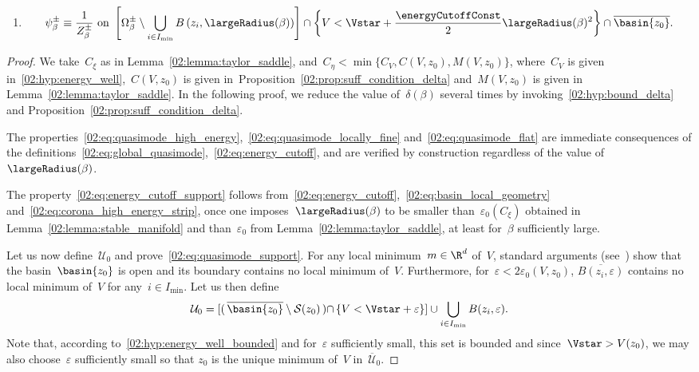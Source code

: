 \begin{proposition}
\begin{enumerate}[]
                    \item{\begin{equation}\label{02:eq:quasimode_flat}
                        \psi_\beta^\pm \equiv \frac1{Z_\beta^\pm}\text{ on }\left[\Omega_\beta^\pm \setminus \bigcup_{i\in I_{\min}} B\left(z_i,\largeRadius(\beta)\right)\right] \cap \left\{V < \Vstar + \frac{\energyCutoffConst}2\largeRadius(\beta)^2\right\} \cap \overline{\basin{z_0}}.
                    \end{equation}}
                \end{enumerate}
            \end{proposition}
            \begin{proof}

                We take~$C_\xi$ as in Lemma~\ref{02:lemma:taylor_saddle}, and~$C_\eta < \min\{C_V,C(V,z_0),M(V,z_0)\}$, where~$C_V$ is given in~\eqref{02:hyp:energy_well},~$C(V,z_0)$ is given in~Proposition~\ref{02:prop:suff_condition_delta} and~$M(V,z_0)$ is given in Lemma~\ref{02:lemma:taylor_saddle}.
                In the following proof, we reduce the value of~$\delta(\beta)$ several times by invoking~\eqref{02:hyp:bound_delta} and Proposition~\ref{02:prop:suff_condition_delta}.

                The properties~\eqref{02:eq:quasimode_high_energy},~\eqref{02:eq:quasimode_locally_fine} and~\eqref{02:eq:quasimode_flat} are immediate consequences of the definitions~\eqref{02:eq:global_quasimode},~\eqref{02:eq:energy_cutoff}, and are verified by construction regardless of the value of~$\largeRadius(\beta)$.
                
                The property~\eqref{02:eq:energy_cutoff_support} follows from~\eqref{02:eq:energy_cutoff},~\eqref{02:eq:basin_local_geometry} and~\eqref{02:eq:corona_high_energy_strip}, once one imposes~$\largeRadius(\beta)$ to be smaller than~$\varepsilon_0(C_\xi)$ obtained in Lemma~\ref{02:lemma:stable_manifold} and than~$\varepsilon_0$ from Lemma~\ref{02:lemma:taylor_saddle}, at least for~$\beta$ sufficiently large.

                Let us now define~$\mathcal U_0$ and prove~\eqref{02:eq:quasimode_support}. For any local minimum~$m\in\R^d$ of~$V$, standard arguments (see~\cite[Chapter 8]{T00}) show that the basin~$\basin{z_0}$ is open and its boundary contains no local minimum of~$V$.
                Furthermore, for~$\varepsilon<2\varepsilon_0(V,z_0)$, $\overline{B(z_i,\varepsilon)}$ contains no local minimum of~$V$ for any~$i\in I_{\min}$. Let us then define
                \[\mathcal U_0 = \left[\right(\overline{\basin{z_0}}\setminus \mathcal S(z_0)\left)\cap \left\{V<\Vstar + \varepsilon \right\}\right] \cup\bigcup_{i\in I_{\min}} B(z_i,\varepsilon).\]
                Note that, according to~\eqref{02:hyp:energy_well_bounded} and for~$\varepsilon$ sufficiently small, this set is bounded and since~$\Vstar>V(z_0)$, we may also choose~$\varepsilon$ sufficiently small so that $z_0$ is the unique minimum of~$V$ in~$\overline{\mathcal U}_0$.
                

\end{proof}
